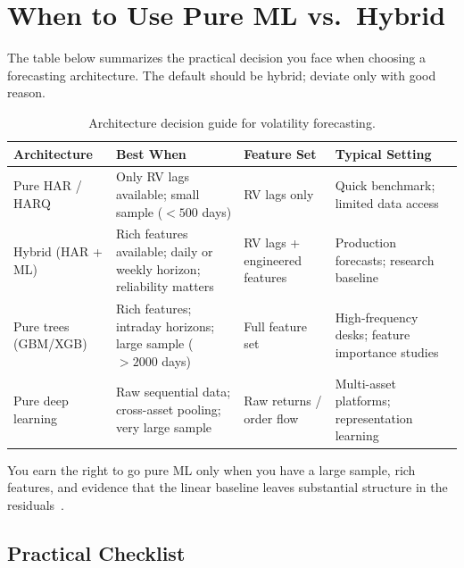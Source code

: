 \section{When to Use Pure ML vs.\ Hybrid}\label{sec:hybrid:decision}

The table below summarizes the practical decision you face when choosing
a forecasting architecture.  The default should be hybrid; deviate only
with good reason.

\begin{table}[htbp]
\centering
\caption{Architecture decision guide for volatility forecasting.}
\label{tab:decision-guide}
\begin{tabular}{p{3.5cm}p{3.2cm}p{3.0cm}p{3.5cm}}
\toprule
\textbf{Architecture} & \textbf{Best When} & \textbf{Feature Set} &
  \textbf{Typical Setting} \\
\midrule
Pure HAR / HARQ
  & Only RV lags available; small sample ($<500$ days)
  & RV lags only
  & Quick benchmark; limited data access \\
\addlinespace
Hybrid (HAR + ML)
  & Rich features available; daily or weekly horizon; reliability matters
  & RV lags + engineered features
  & Production forecasts; research baseline \\
\addlinespace
Pure trees (GBM/XGB)
  & Rich features; intraday horizons; large sample ($>2000$ days)
  & Full feature set
  & High-frequency desks; feature importance studies \\
\addlinespace
Pure deep learning
  & Raw sequential data; cross-asset pooling; very large sample
  & Raw returns / order flow
  & Multi-asset platforms; representation learning \\
\bottomrule
\end{tabular}
\end{table}

\begin{keyidea}
You earn the right to go pure ML only when you have a large sample, rich
features, and evidence that the linear baseline leaves substantial
structure in the residuals~\citep{RahimikiaPoon2020}.
\end{keyidea}

\subsection{Practical Checklist}

